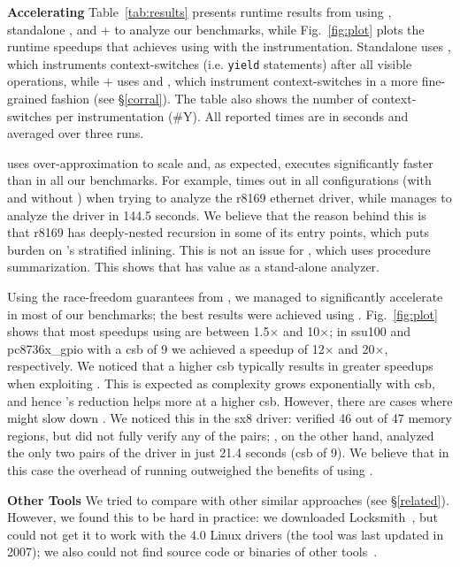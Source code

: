 \noindent\textbf{Accelerating \corral }
%
Table~\ref{tab:results} presents runtime results from using \whoop, standalone \corral, and \whoop + \corral to analyze our benchmarks, while Fig.~\ref{fig:plot} plots the runtime speedups that \corral achieves using \whoop with the \yieldmr instrumentation. Standalone \corral uses \yieldall, which instruments context-switches (i.e. \texttt{yield} statements) after all visible operations, while \whoop + \corral uses \yieldcoarse and \yieldmr, which instrument context-switches in a more fine-grained fashion (see \S\ref{corral}). The table also shows the number of context-switches per instrumentation (\#Y). All reported times are in seconds and averaged over three runs.

\whoop uses over-approximation to scale and, as expected, executes significantly faster than \corral in all our benchmarks. For example, \corral times out in all configurations (with and without \whoop) when trying to analyze the r8169 ethernet driver, while \whoop manages to analyze the driver in 144.5 seconds. We believe that the reason behind this is that r8169 has deeply-nested recursion in some of its entry points, which puts burden on \corral's stratified inlining. This is not an issue for \whoop, which uses procedure summarization. This shows that \whoop has value as a stand-alone analyzer.

Using the race-freedom guarantees from \whoop, we managed to significantly accelerate \corral in most of our benchmarks; the best results were achieved using \yieldmr. Fig.~\ref{fig:plot} shows that most speedups using \yieldmr are between 1.5$\times$ and 10$\times$; in ssu100 and pc8736x\_gpio with a csb of 9 we achieved a speedup of 12$\times$ and 20$\times$, respectively. We noticed that a higher csb typically results in greater speedups when exploiting \whoop. This is expected as complexity grows exponentially with csb, and hence \whoop's reduction helps more at a higher csb.
%
However, there are cases where \whoop might slow down \corral. We noticed this in the sx8 driver: \whoop verified 46 out of 47 memory regions, but did not fully verify any of the pairs; \corral, on the other hand, analyzed the only two pairs of the driver in just 21.4 seconds (csb of 9). We believe that in this case the overhead of running \whoop outweighed the benefits of using \yieldmr.

\noindent\textbf{Other Tools }
%
We tried to compare \whoop with other similar approaches (see \S\ref{related}). However, we found this to be hard in practice: we downloaded Locksmith~\cite{pratikakis2006locksmith}, but could not get it to work with the 4.0 Linux drivers (the tool was last updated in 2007); we also could not find source code or binaries of other tools~\cite{kahlon2007fast, kahlon2009semantic, das2015section}.

